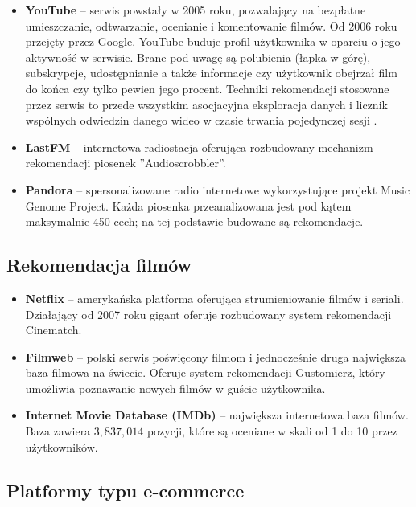 \documentclass[twoside]{iisthesis}
\begin{document}
		 \begin{itemize}
		 	\item \textbf{YouTube} -- serwis powstały w 2005 roku, pozwalający na bezpłatne umieszczanie, odtwarzanie, ocenianie i komentowanie filmów. Od 2006 roku przejęty przez Google. YouTube buduje profil użytkownika w oparciu o jego aktywność w serwisie. Brane pod uwagę są polubienia (łapka w górę), subskrypcje, udostępnianie a także informacje czy użytkownik obejrzał film do końca czy tylko pewien jego procent. Techniki rekomendacji stosowane przez serwis to przede wszystkim asocjacyjna eksploracja danych i licznik wspólnych odwiedzin danego wideo w czasie trwania pojedynczej sesji \cite{id:TheYouTubeVideoRecommendationSystem}. 
		 	\item \textbf{LastFM } -- internetowa radiostacja oferująca rozbudowany mechanizm rekomendacji piosenek ''Audioscrobbler''.   
		 	\item \textbf{Pandora}	-- spersonalizowane radio internetowe wykorzystujące projekt Music Genome Project. Każda piosenka przeanalizowana jest pod kątem maksymalnie 450 cech; na tej podstawie budowane są rekomendacje\cite{id:mgp}.
	
		 \end{itemize}
	 
		 \subsection{Rekomendacja filmów}
		 \begin{itemize}
			 \item \textbf{Netflix} -- amerykańska platforma oferująca strumieniowanie filmów i seriali. Działający od 2007 roku gigant oferuje rozbudowany system rekomendacji Cinematch\cite{id:aStreamOfMovies}. 
			 \item \textbf{Filmweb} -- polski serwis poświęcony filmom i jednocześnie druga największa baza filmowa na świecie. Oferuje system rekomendacji Gustomierz, który umożliwia poznawanie nowych filmów w guście użytkownika\cite{id:filmwebfaq}.
			 \item \textbf{Internet Movie Database (IMDb)} -- największa internetowa baza filmów. Baza zawiera $3,837,014$ pozycji, które są oceniane w skali od 1 do 10 przez użytkowników\cite{id:imdbstats}.
		 \end{itemize}
		 
		 \subsection{Platformy typu e-commerce}
	
\end{document}
